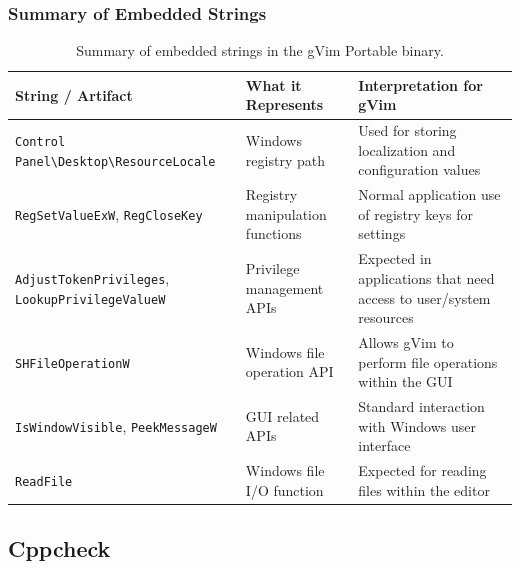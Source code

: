 \documentclass{article}
\begin{document}
\subsubsection{Summary of Embedded Strings}
\begin{table}[H]
  \centering
  \begin{tabular}{|p{5cm}|p{3cm}|p{6cm}|}
    \hline
    \textbf{String / Artifact} & \textbf{What it Represents} & \textbf{Interpretation for gVim} \\
    \hline
    \texttt{Control Panel\textbackslash Desktop\textbackslash ResourceLocale} & Windows registry path & Used for storing localization and configuration values \\
    \hline
    \texttt{RegSetValueExW}, \texttt{RegCloseKey} & Registry manipulation functions & Normal application use of registry keys for settings \\
    \hline
    \texttt{AdjustTokenPrivileges}, \texttt{LookupPrivilegeValueW} & Privilege management APIs & Expected in applications that need access to user/system resources \\
    \hline
    \texttt{SHFileOperationW} & Windows file operation API & Allows gVim to perform file operations within the GUI \\
    \hline
    \texttt{IsWindowVisible}, \texttt{PeekMessageW} & GUI related APIs & Standard interaction with Windows user interface \\
    \hline
    \texttt{ReadFile} & Windows file I/O function & Expected for reading files within the editor \\
    \hline
  \end{tabular}
  \caption{Summary of embedded strings in the gVim Portable binary.}
  \label{tab:gvim-strings}
\end{table}

\subsection{Cppcheck}
\end{document}
